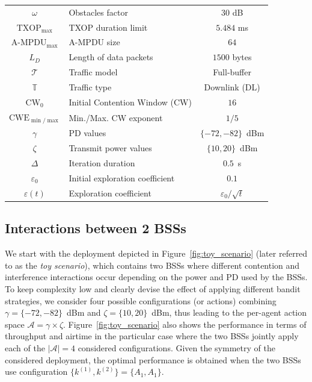 \begin{table}[ht!]
{\begin{tabular}{@{}clc@{}}
$\omega$ & Obstacles factor & $30$ dB\\
$\text{TXOP}_{\max}$ & TXOP duration limit & $5.484$ ms\\ 
$\text{A-MPDU}_{\max}$ & A-MPDU size & $64$\\ 
$L_{D}$ & Length of data packets & $1500$ bytes \\ 
$\mathcal{T}$ & Traffic model & Full-buffer\\ 
$\mathbb{T}$ & Traffic type & Downlink (DL) \\ 
$\text{CW}_0$ & Initial Contention Window (CW) & $16$ \\
$\text{CWE}_{\min/\max}$ & Min./Max. CW exponent & $1/5$ \\
\midrule
$\gamma$ & PD values & $\{-72, -82\}$~dBm\\
$\zeta$ & Transmit power values & $\{10, 20\}$~dBm\\
$\Delta$ & Iteration duration & $0.5$~s \\
$\varepsilon_0$ & Initial exploration coefficient & $0.1$ \\
$\varepsilon(t)$ & Exploration coefficient & $\varepsilon_0/\sqrt{t}$ \\
\bottomrule
\end{tabular}%
}
\end{table}

\subsection{Interactions between 2 BSSs}

We start with the deployment depicted in Figure~\ref{fig:toy_scenario} (later referred to as the \textit{toy scenario}), which contains two BSSs where different contention and interference interactions occur depending on the power and PD used by the BSSs. To keep complexity low and clearly devise the effect of applying different bandit strategies, we consider four possible configurations (or actions) combining  $\gamma = \{-72, -82\}$~dBm and $\zeta = \{10,20\}$~dBm, thus leading to the per-agent action space $\mathcal{A} = \gamma \times \zeta$. Figure~\ref{fig:toy_scenario} also shows the performance in terms of throughput and airtime in the particular case where the two BSSs jointly apply each of the $|\mathcal{A}|=4$ considered configurations. Given the symmetry of the considered deployment, the optimal performance is obtained when the two BSSs use configuration $\{k^{(1)}, k^{(2)}\} = \{A_1, A_1\}$.

